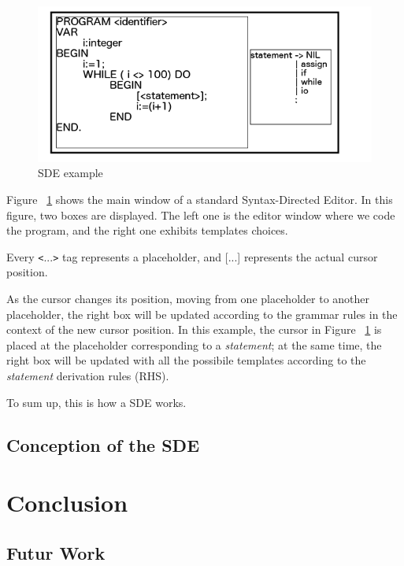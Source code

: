 \documentclass[
  oneside,
  11pt, a4paper,
  footinclude=true,
  headinclude=true,
  cleardoublepage=empty
]{scrbook}
\begin{document}
\begin{figure}[h!]
  \centering
    \includegraphics[width=1\textwidth]{img/SDE.png}
    \caption{SDE example}
    \label{fig:SDE}
\end{figure}


Figure ~\ref{fig:SDE} shows the main window of a standard Syntax-Directed Editor.
In this figure, two boxes are displayed.
The left one is the editor window where we code the program, and the right one exhibits templates choices.

Every \texttt{<}...\texttt{>}  tag represents a placeholder, and [...] represents the actual cursor position.

As the cursor changes its position, moving from one placeholder to another placeholder, the right box will be updated according to the grammar rules in the context of the new cursor position.
In this example, the cursor in Figure ~\ref{fig:SDE} is placed at the placeholder corresponding to a \textit{statement}; at the same time, the right box will be updated with all the possibile templates according to the \textit{statement} derivation rules (RHS).

To sum up, this is how a SDE works.

\section{Conception of the SDE}


\chapter{Conclusion}
\section{Futur Work}
\end{document}
